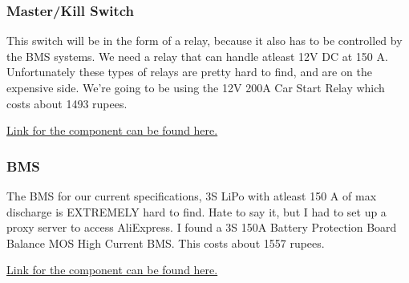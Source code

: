\documentclass[12pt]{article}
\begin{document}
\subsubsection*{Master/Kill Switch}
This switch will be in the form of a relay, because it also has to be controlled by the BMS systems. We need a relay that can handle atleast 12V DC at 150 A. Unfortunately these types of relays are pretty hard to find, and are on the expensive side.
\newline
We're going to be using the 12V 200A Car Start Relay which costs about 1493 rupees.

\href{https://order2india.com/products/12v-200a-car-start-relay-with-accessories?variant=43710190583930&utm_source=google&utm_medium=organic&utm_campaign=ALL&utm_content=12V\%20200A\%20Car\%20Start\%20Relay\%20with\%20Accessories&gad_source=1&gad_campaignid=21058867647&gbraid=0AAAAADjpDzQd_h_QiVlT-siNAMC-BX8IV&gclid=CjwKCAjw_pDBBhBMEiwAmY02NoSwFztjR-UFZ8ERJ-SUvc4wo6-MO1Tyu-ZFE0xYVFXtt13ZgQBkBhoCj_MQAvD_BwE}{Link for the component can be found here.}

\subsubsection*{BMS}
The BMS for our current specifications, 3S LiPo with atleast 150 A of max discharge is EXTREMELY hard to find. Hate to say it, but I had to set up a proxy server to access AliExpress. I found a 3S 150A Battery Protection Board Balance MOS High Current BMS. 
This costs about 1557 rupees.

\href{https://www.aliexpress.com/item/1005003684963240.html}{Link for the component can be found here.}
\end{document}
